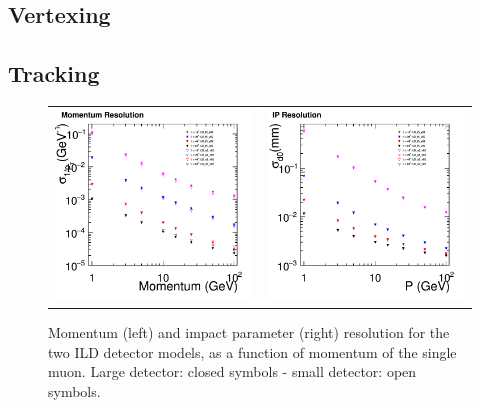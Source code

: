 \subsection{Vertexing}

\subsection{Tracking}


%
% 
\begin{figure}[b!]
\begin{tabular}{cc}
\includegraphics[width=0.5\hsize]{Performance/fig/PResolution_ILD_ls5_v02.png} &
\includegraphics[width=0.5\hsize]{Performance/fig/IPResolution_ILD_ls5_v02.png}
\end{tabular}
\caption{\label{fig:perf:trkres} Momentum (left) and impact parameter (right) resolution for the two ILD detector models,
  as a function of momentum of the single muon. Large detector: closed symbols - small detector: open symbols.}
\end{figure}


